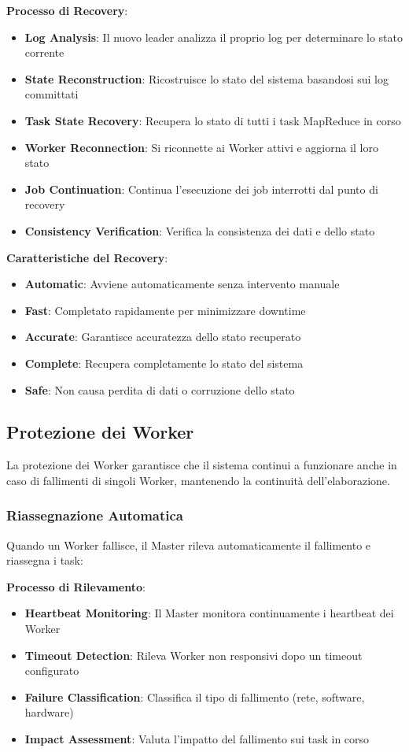 \documentclass[12pt,a4paper]{article}
\begin{document}
\textbf{Processo di Recovery}:
\begin{itemize}
\item \textbf{Log Analysis}: Il nuovo leader analizza il proprio log per determinare lo stato corrente
\item \textbf{State Reconstruction}: Ricostruisce lo stato del sistema basandosi sui log committati
\item \textbf{Task State Recovery}: Recupera lo stato di tutti i task MapReduce in corso
\item \textbf{Worker Reconnection}: Si riconnette ai Worker attivi e aggiorna il loro stato
\item \textbf{Job Continuation}: Continua l'esecuzione dei job interrotti dal punto di recovery
\item \textbf{Consistency Verification}: Verifica la consistenza dei dati e dello stato
\end{itemize}

\textbf{Caratteristiche del Recovery}:
\begin{itemize}
\item \textbf{Automatic}: Avviene automaticamente senza intervento manuale
\item \textbf{Fast}: Completato rapidamente per minimizzare downtime
\item \textbf{Accurate}: Garantisce accuratezza dello stato recuperato
\item \textbf{Complete}: Recupera completamente lo stato del sistema
\item \textbf{Safe}: Non causa perdita di dati o corruzione dello stato
\end{itemize}

\subsection{Protezione dei Worker}

La protezione dei Worker garantisce che il sistema continui a funzionare anche in caso di fallimenti di singoli Worker, mantenendo la continuità dell'elaborazione.

\subsubsection{Riassegnazione Automatica}

Quando un Worker fallisce, il Master rileva automaticamente il fallimento e riassegna i task:

\textbf{Processo di Rilevamento}:
\begin{itemize}
\item \textbf{Heartbeat Monitoring}: Il Master monitora continuamente i heartbeat dei Worker
\item \textbf{Timeout Detection}: Rileva Worker non responsivi dopo un timeout configurato
\item \textbf{Failure Classification}: Classifica il tipo di fallimento (rete, software, hardware)
\item \textbf{Impact Assessment}: Valuta l'impatto del fallimento sui task in corso
\end{itemize}
\end{document}
